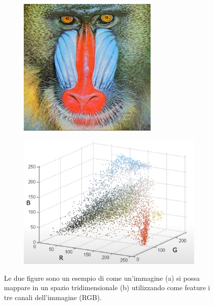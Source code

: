 \begin{figure}[h!]
     \centering
     \begin{subfigure}[b]{0.4\textwidth}
         \centering
         \includegraphics[width=\textwidth]{img/scimmia.jpeg}
         \caption{}
         \label{fig:y equals x}
     \end{subfigure}
     \hfill
     \begin{subfigure}[b]{0.5\textwidth}
         \centering
         \includegraphics[width=\textwidth]{img/plot-scimmia.png}
         \caption{}
         \label{fig:three sin x}
     \end{subfigure}
        \caption{Le due figure sono un esempio di come un'immagine (a) si possa mappare in un spazio tridimensionale (b) utilizzando come feature i tre canali dell'immagine (RGB).}
        \label{fig:scimmia}
\end{figure}

